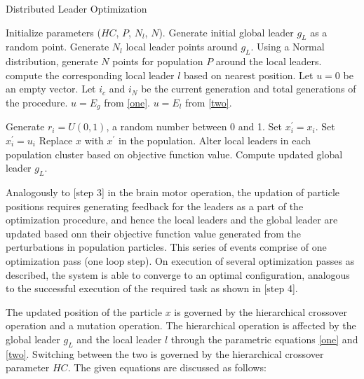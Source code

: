 \begin{algorithm}
\caption{Distributed Leader Optimization}
\label{algo}
\begin{algorithmic}[1]
    \State Initialize parameters ($HC$, $P$, $N_l$, $N$).
    \State Generate initial global leader $g_L$ as a random point.
    \State Generate $N_l$ local leader points around $g_L$.
    \State Using a Normal distribution, generate $N$ points for population $P$ around the local leaders.
        \State compute the corresponding local leader $l$ based on nearest position.
        \State Let $u = 0$ be an empty vector.
        \State Let $i_c$ and $i_N$ be the current generation and total generations of the procedure.
          \State $u = E_g$ from \eqref{one}.
        \Else
          \State $u = E_l$ from \eqref{two}.
        \EndIf
        
          \State Generate $r_i = U(0, 1)$, a random number between 0 and 1.
            \State Set $x_i^{'} = x_i$.
          \Else
            \State Set $x_i^{'} = u_i$
          \EndIf
        \EndFor
          \State Replace $x$ with $x^{'}$ in the population.
        \EndIf
      \EndFor
      \State Alter local leaders in each population cluster based on objective function value.
      \State Compute updated global leader $g_L$.
    \EndWhile
  \EndProcedure
\end{algorithmic}
\end{algorithm}

Analogously to [step 3] in the brain motor operation, the updation of particle positions requires generating feedback for the leaders as a part of the optimization procedure, and hence the local leaders and the global leader are updated based onn their objective function value generated from the perturbations in population particles. This series of events comprise of one optimization pass (one loop step). On execution of several optimization passes as described, the system is able to converge to an optimal configuration, analogous to the successful execution of the required task as shown in [step 4].

The updated position of the particle $x$ is governed by the hierarchical crossover operation and a mutation operation. The hierarchical operation is affected by the global leader $g_L$ and the local leader $l$ through the parametric equations \eqref{one} and \eqref{two}. Switching between the two is governed by the hierarchical crossover parameter $HC$. The given equations are discussed as follows:


